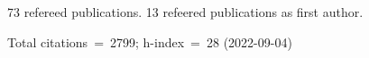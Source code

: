 73 refereed publications. 13 refeered publications as first author.

Total citations~=~2799; h-index~=~28 (2022-09-04)